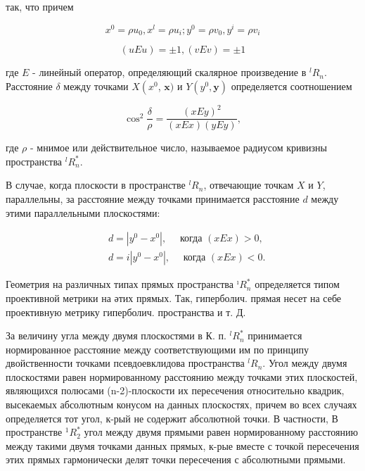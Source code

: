 \documentclass[10pt]{article}
\begin{document}
так, что причем



\[

x^{0}=\rho u_{0}, x^{l}=\rho u_{i} ; y^{0}=\rho v_{0}, y^{i}=\rho v_{i}

\]



\[

(u E u)= \pm 1,(v E v)= \pm 1

\]



где $E$ - линейный оператор, определяющий скалярное произведение в ${ }^{l} R_{n}$. Расстояние $\delta$ между точками $X\left(x^{0}\right.$, $\boldsymbol{x})$ и $Y\left(y^{0}, \boldsymbol{y}\right)$ определяется соотношением



\[

\cos ^{2} \frac{\delta}{\rho}=\frac{(x E y)^{2}}{(x E x)(y E y)},

\]



где $\rho$ - мнимое или действительное число, называемое радиусом кривизны пространства ${ }^{l} R_{n}^{*}$.



В случае, когда плоскости в пространстве ${ }^{l} R_{n}$, отвечающие точкам $X$ и $Y$, параллельны, за расстояние между точками принимается расстояние $d$ между этими параллельными плоскостями:



\[

\begin{aligned}

& d=\left|y^{0}-x^{0}\right|, \quad \text { когда }(x E x)>0, \\

& d=i\left|y^{0}-x^{0}\right|, \quad \text { когда }(x E x)<0 .

\end{aligned}

\]



Геометрия на различных типах прямых пространства ${ }^{\imath} R_{n}^{*}$ определяется типом проективной метрики на әтих прямых. Так, гиперболич. прямая несет на себе проективную метрику гиперболич. пространства и т. Д.



За величину угла между двумя плоскостями в К. п. ${ }^{l} R_{n}^{*}$ принимается нормированное расстояние между соответствующими им по принципу двойственности точками псевдоевклидова пространства ${ }^{l} R_{n}$. Угол между двумя плоскостями равен нормированному расстоянию между точками этих плоскостей, являющихся полюсами (n-2)-плоскости их пересечения относительно квадрик, высекаемых абсолютным конусом на данных плоскостях, причем во всех случаях определяется тот угол, к-рый не содержит абсолютной точки. В частности, В пространстве ${ }^{1} R_{2}^{*}$ угол между двумя прямыми равен нормированному расстоянию между такими двумя точками данных прямых, к-рые вместе с точкой пересечения этих прямых гармонически делят точки пересечения с абсолютными прямыми.
\end{document}
